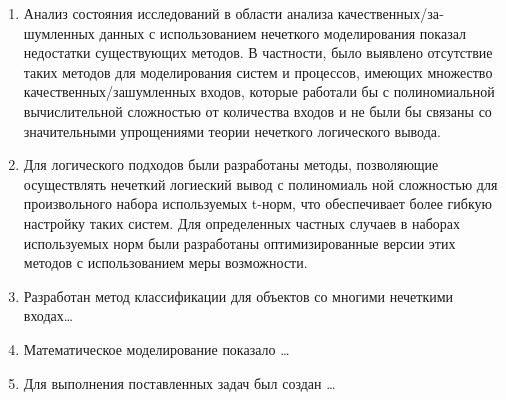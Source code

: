 \begin{enumerate}
  \item Анализ состояния исследований в области анализа качественных/за­шумленных данных с использованием нечеткого моделирования показал недостатки существующих методов. В частности, было выявлено отсут­ствие таких методов для моделирования систем и процессов, имеющих множество качественных/зашумленных входов, которые работали бы с полиномиальной вычислительной сложностью от количества входов и не были бы связаны со значительными упрощениями теории нечеткого логического вывода.
  \item Для логического подходов были разработаны методы, позволяющие осуществлять нечеткий логиеский вывод с полиномиаль­
  ной сложностью для произвольного набора используемых t-норм, что обеспечивает более гибкую настройку таких систем. Для определенных частных случаев в наборах используемых норм были разработаны опти­мизированные версии этих методов с использованием меры возможности.
  \item Разработан метод классификации для объектов со многими нечеткими входах\ldots
  \item Математическое моделирование показало \ldots
  \item Для выполнения поставленных задач был создан \ldots
\end{enumerate}
